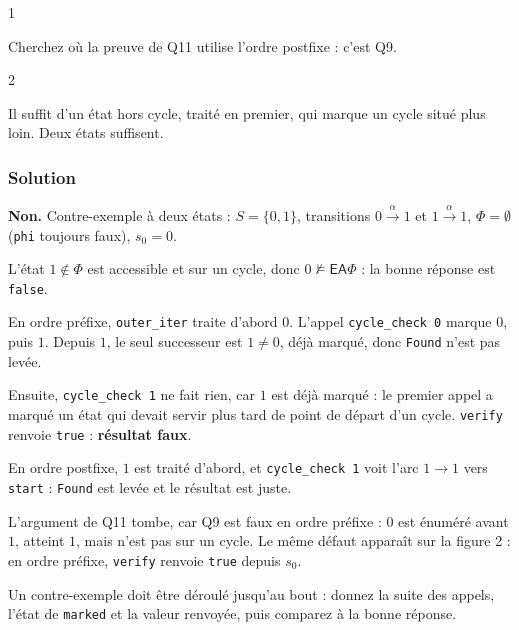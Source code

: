 \documentclass[11pt,a4paper]{article}
\providecommand{\varnothing}{\emptyset}
\begin{document}
\begin{indication}{1}

Cherchez où la preuve de Q11 utilise l'ordre postfixe : c'est Q9.

\end{indication}

\begin{indication}{2}

Il suffit d'un état hors cycle, traité en premier, qui marque un cycle situé plus loin. Deux états suffisent.

\end{indication}

\hypertarget{solution-11}{%
\subsubsection{Solution}\label{solution-11}}

\textbf{Non.} Contre-exemple à deux états : \(S=\{0,1\}\), transitions \(0\xrightarrow{\alpha}1\) et \(1\xrightarrow{\alpha}1\), \(\Phi=\varnothing\) (\texttt{phi} toujours faux), \(s_0=0\).

L'état \(1\notin\Phi\) est accessible et sur un cycle, donc \(0\not\models\mathsf{EA}\Phi\) : la bonne réponse est \texttt{false}.

En ordre préfixe, \texttt{outer\_iter} traite d'abord \(0\). L'appel \texttt{cycle\_check\ 0} marque \(0\), puis \(1\). Depuis \(1\), le seul successeur est \(1\neq0\), déjà marqué, donc \texttt{Found} n'est pas levée.

Ensuite, \texttt{cycle\_check\ 1} ne fait rien, car \(1\) est déjà marqué : le premier appel a marqué un état qui devait servir plus tard de point de départ d'un cycle. \texttt{verify} renvoie \texttt{true} : \textbf{résultat faux}.

En ordre postfixe, \(1\) est traité d'abord, et \texttt{cycle\_check\ 1} voit l'arc \(1\to1\) vers \texttt{start} : \texttt{Found} est levée et le résultat est juste.

L'argument de Q11 tombe, car Q9 est faux en ordre préfixe : \(0\) est énuméré avant \(1\), atteint \(1\), mais n'est pas sur un cycle. Le même défaut apparaît sur la figure 2 : en ordre préfixe, \texttt{verify} renvoie \texttt{true} depuis \(s_0\).

\begin{methode}

Un contre-exemple doit être déroulé jusqu'au bout : donnez la suite des appels, l'état de \texttt{marked} et la valeur renvoyée, puis comparez à la bonne réponse.

\end{methode}
\end{document}
